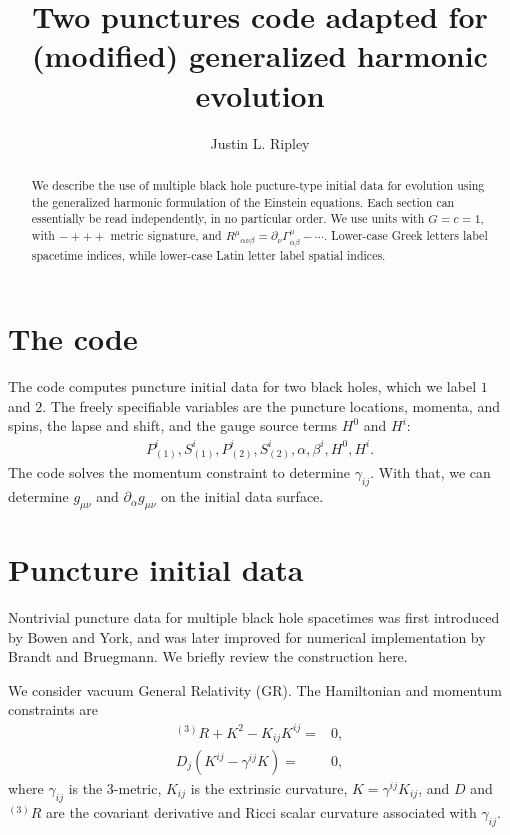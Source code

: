 \documentclass[%
notitlepage,
report,
nofootinbib,
 amsmath,amssymb,
 aps,
]{revtex4-1}
\newcommand{\ssec}[1]{\section{#1}}
\begin{document}
\title{Two punctures code adapted for (modified) generalized harmonic evolution}
\author{Justin L. Ripley}
%
\begin{abstract}
   We describe the use of multiple black hole pucture-type initial data
   for evolution using the generalized harmonic formulation of the
   Einstein equations.
   Each section can essentially be read independently, in no particular order.
   We use units with $G=c=1$, with $-+++$ metric signature, and
   $R^{\mu}{}_{\alpha\nu\beta}=\partial_{\nu}\Gamma^{\mu}_{\alpha\beta}-\cdots$.
   Lower-case Greek letters label spacetime indices, while lower-case
   Latin letter label spatial indices.
\end{abstract}
\maketitle
\ssec{The code}%
The code computes puncture initial data for two black holes, which
we label $1$ and $2$.
The freely specifiable variables are the puncture locations,
momenta, and spins, the lapse and shift, and the gauge source terms
$H^0$ and $H^i$:
\begin{align}
   P_{(1)}^i, S_{(1)}^i, P_{(2)}^i, S_{(2)}^i, \alpha, \beta^i, H^0, H^i
   .
\end{align}
The code solves the momentum constraint to determine $\gamma_{ij}$.
With that, we can determine $g_{\mu\nu}$ and $\partial_{\alpha}g_{\mu\nu}$
on the initial data surface.
\ssec{Puncture initial data}%
Nontrivial puncture data for multiple black hole spacetimes was first
introduced by Bowen and York\cite{Bowen:1980yu}, and was later
improved for numerical implementation by
Brandt and Bruegmann\cite{Brandt:1997tf}.
We briefly review the construction here.

We consider vacuum General Relativity (GR). The Hamiltonian and
momentum constraints are
\begin{subequations}
\begin{align}
   {}^{(3)}R+K^2-K_{ij}K^{ij} 
   =&
   0
   ,\\
   D_j\left(K^{ij}-\gamma^{ij}K\right)
   =&
   0
   ,
\end{align}
\end{subequations}
where $\gamma_{ij}$ is the 3-metric, $K_{ij}$ is the extrinsic curvature,
$K=\gamma^{ij}K_{ij}$, and $D$ and ${}^{(3)}R$ are the covariant derivative
and Ricci scalar curvature associated with $\gamma_{ij}$.
\end{document}

